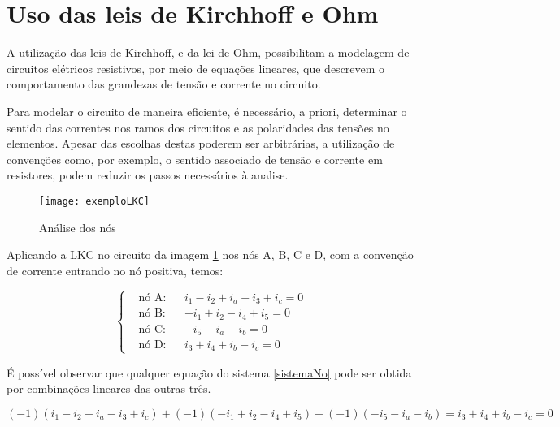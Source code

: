 \documentclass[12pt,fleqn]{book} %
\begin{document}
    \section{Uso das leis de Kirchhoff e Ohm}
    
    A utilização das leis de Kirchhoff, e da lei de Ohm, possibilitam a modelagem de circuitos elétricos resistivos, por meio de equações lineares, que descrevem o comportamento das grandezas de tensão e corrente no circuito.
    
    Para modelar o circuito de maneira eficiente, é necessário, a priori, determinar o sentido das correntes nos ramos dos circuitos e as polaridades das tensões no elementos. Apesar das escolhas destas poderem ser arbitrárias, a utilização de convenções como, por exemplo, o sentido associado de tensão e corrente em resistores, podem reduzir os passos necessários à analise.
    
    \begin{example}[LKC]
        \begin{figure}[!htbp]
           \centering\texttt{[image: exemploLKC]}
            \caption{Análise dos nós}\label{LKCimg}  
        \end{figure}
                       
    
    Aplicando a LKC no circuito da imagem \ref{LKCimg} nos nós A, B, C e D, com a convenção de corrente entrando no nó positiva, temos:
    
    \begin{equation}\label{sistemaNo}
    \left\{\begin{aligned} & 
         \text{nó A:} && i_1 - i_2 + i_a - i_3 + i_c = 0\\& 
         \text{nó B:} && -i_1+i_2-i_4+i_5=0\\&
        \text{nó C:} && -i_5-i_a-i_b=0\\&
        \text{nó D:} && i_3+i_4+i_b-i_c=0
    \end{aligned}\right.
    \end{equation}
    \end{example}
    
    É possível observar que qualquer equação do sistema \ref{sistemaNo} pode ser obtida por combinações lineares das outras três.    
    \begin{example}
    $$ (-1)(i_1 - i_2 + i_a - i_3 + i_c) + (-1)(-i_1+i_2-i_4+i_5) + (-1)(-i_5-i_a-i_b)= i_3+i_4+i_b-i_c = 0 $$
    \end{example}
    
\end{document}
